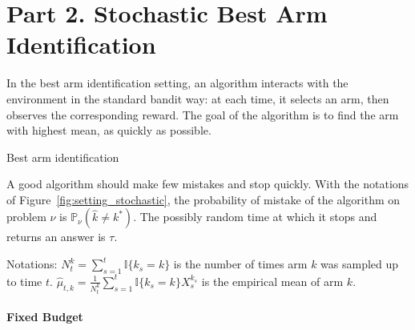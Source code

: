 
\section*{Part 2. Stochastic Best Arm Identification}
\label{sec:best_arm_identification}

In the best arm identification setting, an algorithm interacts with the environment in the standard bandit way: at each time, it selects an arm, then observes the corresponding reward.
The goal of the algorithm is to find the arm with highest mean, as quickly as possible.


\begin{setting}[ht!]
\begin{center}
\end{center}
\caption{Best arm identification}
\label{fig:setting_stochastic}
\end{setting}

A good algorithm should make few mistakes and stop quickly. With the notations of Figure~\ref{fig:setting_stochastic}, the probability of mistake of the algorithm on problem $\nu$ is $\mathbb{P}_\nu(\hat{k} \ne k^*)$. The possibly random time at which it stops and returns an answer is $\tau$.

Notations: $N_t^k = \sum_{s=1}^t \mathbb{I}\{k_s = k\}$ is the number of times arm $k$ was sampled up to time $t$. $\hat{\mu}_{t,k} = \frac{1}{N_t^k} \sum_{s=1}^t \mathbb{I}\{k_s = k\} X_s^{k_s}$ is the empirical mean of arm $k$.

\paragraph{Fixed Budget}
\label{par:fixed_budget}

